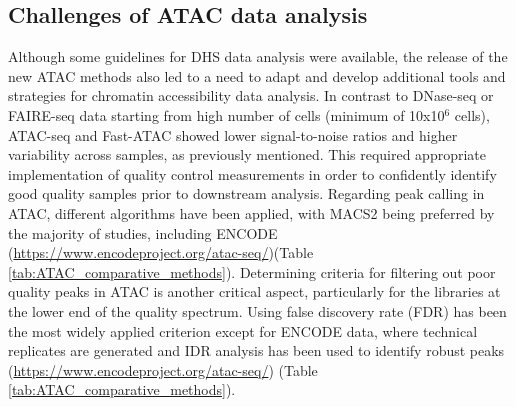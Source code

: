 \subsection{Challenges of ATAC data analysis}  
Although some guidelines for DHS data analysis were available, the release of the new ATAC methods also led to a need to adapt and develop additional tools and strategies for chromatin accessibility data analysis. In contrast to DNase-seq or FAIRE-seq data starting from high number of cells (minimum of 10x10$^6$ cells), ATAC-seq and Fast-ATAC showed lower signal-to-noise ratios and higher variability across samples, as previously mentioned. This required appropriate implementation of quality control measurements in order to confidently identify good quality samples prior to downstream analysis. Regarding peak calling in ATAC, different algorithms have been applied, with MACS2 being preferred by the majority of studies, including ENCODE (\url{https://www.encodeproject.org/atac-seq/})(Table \ref{tab:ATAC_comparative_methods}). Determining criteria for filtering out poor quality peaks in ATAC is another critical aspect, particularly for the libraries at the lower end of the quality spectrum. Using false discovery rate (FDR) has been the most widely applied criterion except for ENCODE data, where technical replicates are generated and IDR analysis has been used to identify robust peaks (\url{https://www.encodeproject.org/atac-seq/}) (Table \ref{tab:ATAC_comparative_methods}). 


